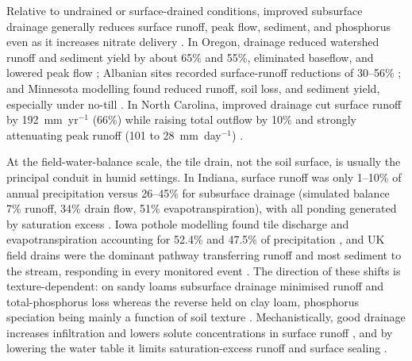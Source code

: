 Relative to undrained or surface-drained conditions, improved subsurface drainage generally reduces surface runoff, peak flow, sediment, and phosphorus even as it increases nitrate delivery \parencite{FAUSEY1995,SKAGGS1994,THOMAS1995,Gramlich2018}. In Oregon, drainage reduced watershed runoff and sediment yield by about 65\% and 55\%, eliminated baseflow, and lowered peak flow \parencite{ISTOK1983}; Albanian sites recorded surface-runoff reductions of 30--56\% \parencite{Grazhdani1996}; and Minnesota modelling found reduced runoff, soil loss, and sediment yield, especially under no-till \parencite{Maalim2013}. In North Carolina, improved drainage cut surface runoff by 192~mm~yr$^{-1}$ (66\%) while raising total outflow by 10\% and strongly attenuating peak runoff (101 to 28~mm~day$^{-1}$) \parencite{KONYHA1992}.

At the field-water-balance scale, the tile drain, not the soil surface, is usually the principal conduit in humid settings. In Indiana, surface runoff was only 1--10\% of annual precipitation versus 26--45\% for subsurface drainage (simulated balance 7\% runoff, 34\% drain flow, 51\% evapotranspiration), with all ponding generated by saturation excess \parencite{Saadat2020}. Iowa pothole modelling found tile discharge and evapotranspiration accounting for 52.4\% and 47.5\% of precipitation \parencite{Amado2018,Martin2019}, and UK field drains were the dominant pathway transferring runoff and most sediment to the stream, responding in every monitored event \parencite{Deasy2009}. The direction of these shifts is texture-dependent: on sandy loams subsurface drainage minimised runoff and total-phosphorus loss whereas the reverse held on clay loam, phosphorus speciation being mainly a function of soil texture \parencite{Eastman2010}. Mechanistically, good drainage increases infiltration and lowers solute concentrations in surface runoff \parencite{Tong2016,Tao2017}, and by lowering the water table it limits saturation-excess runoff and surface sealing \parencite{Augeard2005}.